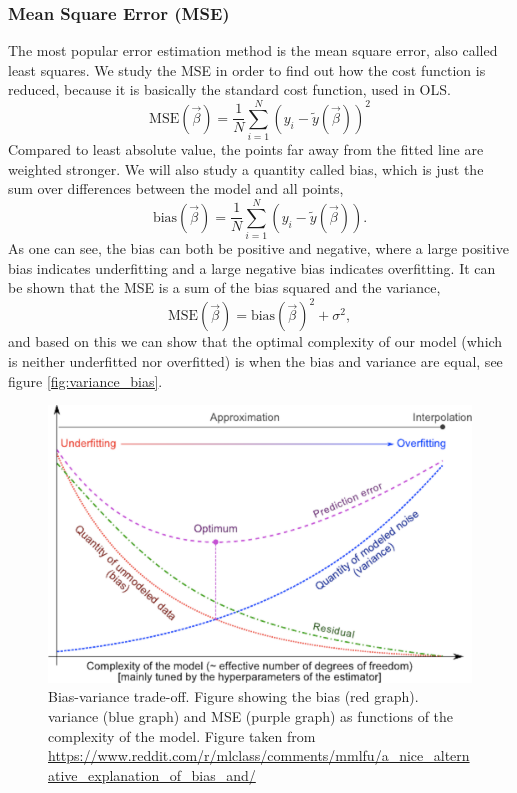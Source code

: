 \subsubsection{Mean Square Error (MSE)} \label{sec:MSE}
The most popular error estimation method is the mean square error, also called least squares. \cite{Hastie} We study the MSE in order to find out how the cost function is reduced, because it is basically the standard cost function, used in OLS. 
\begin{equation}
\text{MSE}(\vec{\beta})=\frac{1}{N}\sum_{i=1}^N(y_i-\tilde{y}(\vec{\beta}))^2
\end{equation}
Compared to least absolute value, the points far away from the fitted line are weighted stronger. We will also study a quantity called bias, which is just the sum over differences between the model and all points,
\begin{equation}
\text{bias}(\vec{\beta})=\frac{1}{N}\sum_{i=1}^N(y_i-\tilde{y}(\vec{\beta})).
\end{equation}
As one can see, the bias can both be positive and negative, where a large positive bias indicates underfitting and a large negative bias indicates overfitting. \cite{Berkley} It can be shown that the MSE is a sum of the bias squared and the variance,
\begin{equation}
\text{MSE}(\vec{\beta})=\text{bias}(\vec{\beta})^2+\sigma^2, 
\end{equation}
and based on this we can show that the optimal complexity of our model (which is neither underfitted nor overfitted) is when the bias and variance are equal, see figure \eqref{fig:variance_bias}.

 \begin{figure} [h]
	\centering
	\includegraphics[scale=0.3]{../plots/variance_bias.png}
	\caption{Bias-variance trade-off. Figure showing the bias (red graph). variance (blue graph) and MSE (purple graph) as functions of the complexity of the model. Figure taken from \url{https://www.reddit.com/r/mlclass/comments/mmlfu/a_nice_alternative_explanation_of_bias_and/}}
	\label{fig:variance_bias}
\end{figure}

